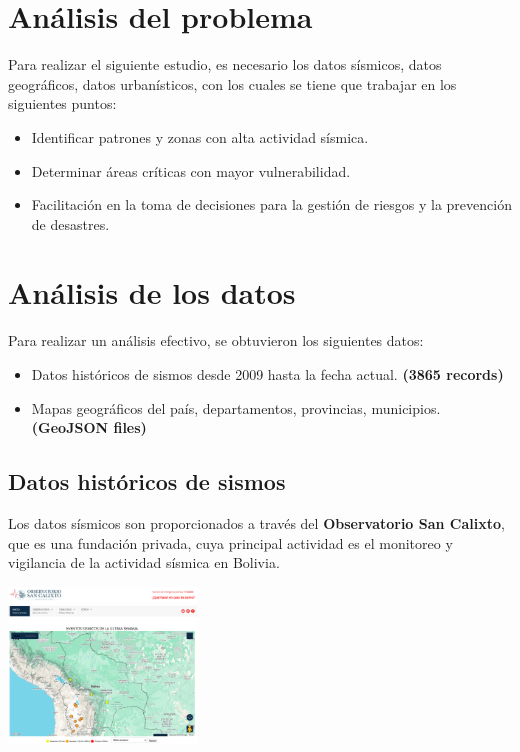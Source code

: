 \documentclass[12pt]{article}
\begin{document}
\section{Análisis del problema}

Para realizar el siguiente estudio, es necesario los datos sísmicos, datos geográficos, datos urbanísticos, con los cuales se tiene que trabajar en los siguientes puntos:

\begin{itemize}
\item Identificar patrones y zonas con alta actividad sísmica.
\item Determinar áreas críticas con mayor vulnerabilidad.
\item Facilitación en la toma de decisiones para la gestión de riesgos y la prevención de desastres.
\end{itemize}


\section{Análisis  de los datos}

Para realizar un análisis efectivo, se obtuvieron los siguientes datos:

\begin{itemize}
\item Datos históricos de sismos desde 2009 hasta la fecha actual. \textbf{(3865 records)}
\item Mapas geográficos del país, departamentos, provincias, municipios. \textbf{(GeoJSON files)}
\end{itemize}

\subsection{Datos históricos de sismos}

Los datos sísmicos son proporcionados a través del \textbf{Observatorio San Calixto}, que es una fundación privada, cuya principal actividad es el monitoreo y vigilancia de la actividad sísmica en Bolivia.


\begin{center}
  \includegraphics[width=5cm]{san_calixto}
\end{center}
\end{document}
